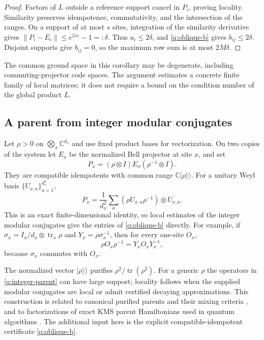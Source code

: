 \begin{proof}
Factors of $L$ outside a reference support cancel in $P_i$, proving
locality.  Similarity preserves idempotence, commutativity, and the
intersection of the ranges.  On a support of at most $s$ sites,
integration of the similarity derivative gives
$\|P_i-E_i\|\leq e^{2s\varepsilon}-1=:\delta$.
Thus $a_i\leq2\delta$, and \eqref{q:oblique-b} gives
$b_{ij}\leq2\delta$.  Disjoint supports give $b_{ij}=0$, so the
maximum row sum is at most $2M\delta$.
\end{proof}

The common ground space in this corollary may be degenerate, including
commuting-projector code spaces.  The argument estimates a concrete
finite family of local matrices; it does not require a bound on the
condition number of the global product $L$.

\subsection{A parent from integer modular conjugates}

Let $\rho>0$ on $\bigotimes_x\mathbb C^{d_x}$ and use fixed product
bases for vectorization.  On two copies of the system let $E_x$ be the
normalized Bell projector at site $x$, and set
\[
 P_x=(\rho\otimes I)E_x(\rho^{-1}\otimes I).
\]
They are compatible idempotents with common range
$\mathbb C|\rho\rangle\!\rangle$.  For a unitary Weyl basis
$\{U_{x,a}\}_{a=1}^{d_x^2}$,
\begin{equation}
 P_x=\frac1{d_x^2}\sum_a
       (\rho U_{x,a}\rho^{-1})\otimes\overline{U_{x,a}}.
 \label{q:integer-parent}
\end{equation}
This is an exact finite-dimensional identity, so local estimates of the
integer modular conjugates give the entries of
\eqref{q:oblique-b} directly.  For example, if
$\sigma_x=I_x/d_x\otimes\operatorname{tr}_x\rho$ and
$Y_x=\rho\sigma_x^{-1}$, then for every one-site $O_x$,
\begin{equation}
 \rho O_x\rho^{-1}=Y_xO_xY_x^{-1},
 \label{q:ratio-modular}
\end{equation}
because $\sigma_x$ commutes with $O_x$.

The normalized vector $|\rho\rangle\!\rangle$ purifies
$\rho^2/\operatorname{tr}(\rho^2)$.  For a generic $\rho$ the operators
in \eqref{q:integer-parent} can have large support; locality follows
when the supplied modular conjugates are local or admit certified
decaying approximations.  This construction is related to canonical
purified parents and their mixing criteria \cite{q:LPP2025}, and to
factorizations of exact KMS parent Hamiltonians used in quantum
algorithms \cite{q:LJL2026}.  The additional input here is the explicit
compatible-idempotent certificate \eqref{q:oblique-b}.

